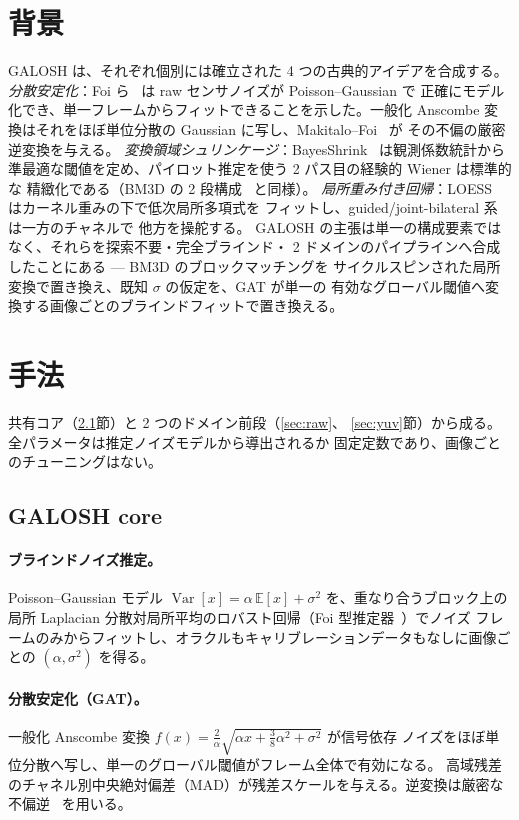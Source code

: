 \documentclass[10pt,twocolumn]{article}
\begin{document}
\section{背景}
GALOSH は、それぞれ個別には確立された 4 つの古典的アイデアを合成する。
\emph{分散安定化}：Foi ら~\cite{foi} は raw センサノイズが Poisson--Gaussian で
正確にモデル化でき、単一フレームからフィットできることを示した。一般化 Anscombe
変換はそれをほぼ単位分散の Gaussian に写し、Makitalo--Foi~\cite{makitalo} が
その不偏の厳密逆変換を与える。
\emph{変換領域シュリンケージ}：BayesShrink~\cite{bayesshrink} は観測係数統計から
準最適な閾値を定め、パイロット推定を使う 2 パス目の経験的 Wiener は標準的な
精緻化である（BM3D の 2 段構成~\cite{bm3d} と同様）。
\emph{局所重み付き回帰}：LOESS~\cite{loess} はカーネル重みの下で低次局所多項式を
フィットし、guided/joint-bilateral 系~\cite{kopf,guidedfilter} は一方のチャネルで
他方を操舵する。
GALOSH の主張は単一の構成要素ではなく、それらを探索不要・完全ブラインド・
2 ドメインのパイプラインへ合成したことにある --- BM3D のブロックマッチングを
サイクルスピンされた局所変換で置き換え、既知 $\sigma$ の仮定を、GAT が単一の
有効なグローバル閾値へ変換する画像ごとのブラインドフィットで置き換える。

\section{手法}\label{sec:method}
共有コア（\ref{sec:core}節）と 2 つのドメイン前段（\ref{sec:raw}、
\ref{sec:yuv}節）から成る。全パラメータは推定ノイズモデルから導出されるか
固定定数であり、画像ごとのチューニングはない。

\subsection{GALOSH core}\label{sec:core}
\paragraph{ブラインドノイズ推定。}
Poisson--Gaussian モデル
$\operatorname{Var}[x]=\alpha\,\mathbb{E}[x]+\sigma^2$ を、重なり合うブロック上の
局所 Laplacian 分散対局所平均のロバスト回帰（Foi 型推定器~\cite{foi}）でノイズ
フレームのみからフィットし、オラクルもキャリブレーションデータもなしに画像ごとの
$(\alpha,\sigma^2)$ を得る。

\paragraph{分散安定化（GAT）。}
一般化 Anscombe 変換
$f(x)=\tfrac{2}{\alpha}\sqrt{\alpha x+\tfrac38\alpha^2+\sigma^2}$ が信号依存
ノイズをほぼ単位分散へ写し、単一のグローバル閾値がフレーム全体で有効になる。
高域残差のチャネル別中央絶対偏差（MAD）が残差スケールを与える。逆変換は厳密な
不偏逆~\cite{makitalo} を用いる。
\end{document}
